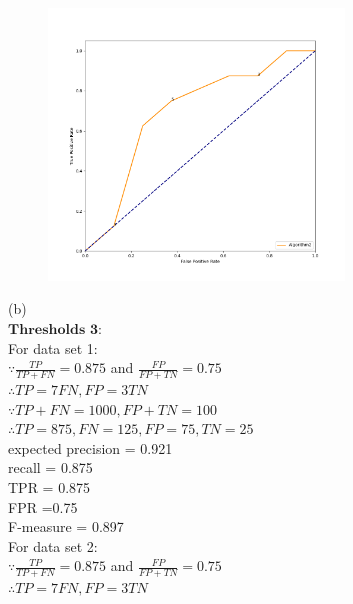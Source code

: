 \documentclass[12pt]{article}
\begin{document}
\begin{figure}[H] 
\centering 
\includegraphics[width=0.7\textwidth]{algo2} 
\end{figure}

(b)\\

$\textbf{Thresholds 3:}$ \\

For data set 1:\\

$\because \frac{TP}{TP+FN} = 0.875$ and $\frac{FP}{FP+TN} = 0.75$\\

$\therefore TP = 7FN, FP = 3TN$\\

$\because TP + FN = 1000, FP + TN = 100$\\

$\therefore TP = 875, FN = 125, FP = 75, TN = 25$\\

expected precision = 0.921\\

recall = 0.875\\

TPR = 0.875\\

FPR =0.75\\

F-measure = 0.897\\

For data set 2:\\

$\because \frac{TP}{TP+FN} = 0.875$ and $\frac{FP}{FP+TN} = 0.75$\\

$\therefore TP = 7FN, FP = 3TN$\\
\end{document}
